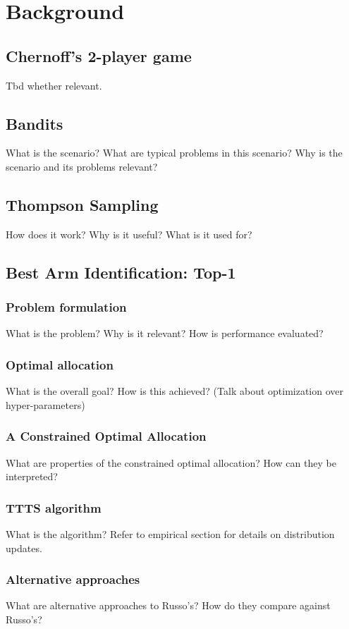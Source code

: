 
\chapter{Background}

\section{Chernoff's 2-player game}
Tbd whether relevant.

\section{Bandits}
What is the scenario?
What are typical problems in this scenario?
Why is the scenario and its problems relevant?

\section{Thompson Sampling}
How does it work?
Why is it useful?
What is it used for?

\section{Best Arm Identification: Top-1}
\subsection{Problem formulation}
What is the problem?
Why is it relevant?
How is performance evaluated?
\subsection{Optimal allocation}
What is the overall goal?
How is this achieved? (Talk about optimization over hyper-parameters)
\subsection{A Constrained Optimal Allocation}
What are properties of the constrained optimal allocation?
How can they be interpreted?
\subsection{TTTS algorithm}
What is the algorithm?
Refer to empirical section for details on distribution updates.
\subsection{Alternative approaches}
What are alternative approaches to Russo's?
How do they compare against Russo's?

